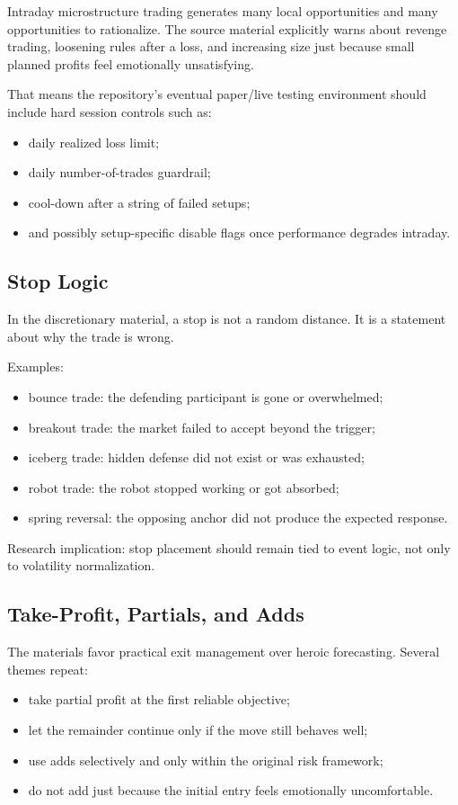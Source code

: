 Intraday microstructure trading generates many local opportunities and many opportunities to rationalize.
The source material explicitly warns about revenge trading, loosening rules after a loss, and increasing size just because small planned profits feel emotionally unsatisfying.

That means the repository's eventual paper/live testing environment should include hard session controls such as:
\begin{itemize}
  \item daily realized loss limit;
  \item daily number-of-trades guardrail;
  \item cool-down after a string of failed setups;
  \item and possibly setup-specific disable flags once performance degrades intraday.
\end{itemize}

\subsection{Stop Logic}

In the discretionary material, a stop is not a random distance.
It is a statement about why the trade is wrong.

Examples:
\begin{itemize}
  \item bounce trade: the defending participant is gone or overwhelmed;
  \item breakout trade: the market failed to accept beyond the trigger;
  \item iceberg trade: hidden defense did not exist or was exhausted;
  \item robot trade: the robot stopped working or got absorbed;
  \item spring reversal: the opposing anchor did not produce the expected response.
\end{itemize}

Research implication: stop placement should remain tied to event logic, not only to volatility normalization.

\subsection{Take-Profit, Partials, and Adds}

The materials favor practical exit management over heroic forecasting.
Several themes repeat:
\begin{itemize}
  \item take partial profit at the first reliable objective;
  \item let the remainder continue only if the move still behaves well;
  \item use adds selectively and only within the original risk framework;
  \item do not add just because the initial entry feels emotionally uncomfortable.
\end{itemize}

